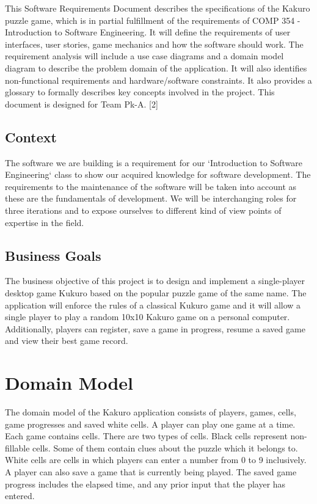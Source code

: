 \documentclass[12pt]{article}
\begin{document}
This Software Requirements Document describes the specifications of the Kakuro puzzle game, which is in partial fulfillment of the requirements of COMP 354 - Introduction to Software Engineering. It will define the requirements of user interfaces, user stories, game mechanics and how the software should work. The requirement analysis will include a use case diagrams and a domain model diagram to describe the problem domain of the application. It will also identifies non-functional requirements and hardware/software constraints. It also provides a glossary to formally describes key concepts involved in the project. This document is designed for Team Pk-A. [2]
 
\subsection{Context}

The software we are building is a requirement for our `Introduction to Software Engineering` class to show our acquired knowledge for software development. The requirements to the maintenance of the software will be taken into account as these are the fundamentals of development. We will be interchanging roles for three iterations and to expose ourselves to different kind of view points of expertise in the field.

\subsection{Business Goals}

The business objective of this project is to design and implement a single-player desktop game Kukuro based on the popular puzzle game of the same name. The application will enforce the rules of a classical Kukuro game and it will allow a single player to play a random 10x10 Kakuro game on a personal computer. Additionally, players can register, save a game in progress, resume a saved game and view their best game record.

\newpage

\section{Domain Model}

The domain model of the Kakuro application consists of players, games, cells, game progresses and saved white cells. A player can play one game at a time. Each game contains cells. There are two types of cells. Black cells represent non-fillable cells. Some of them contain clues about the puzzle which it belongs to. White cells are cells in which players can enter a number from 0 to 9 inclusively. A player can also save a game that is currently being played. The saved game progress includes the elapsed time, and any prior input that the player has entered. 
\end{document}
